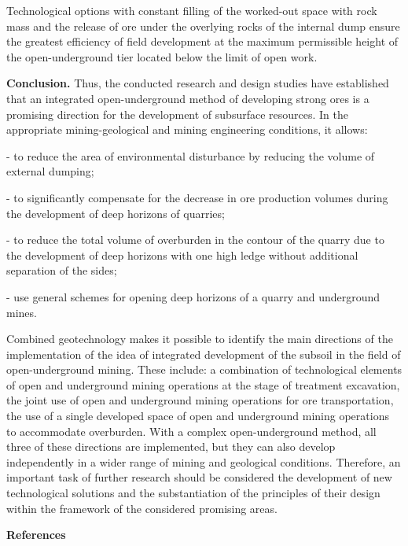 \begin{multicols}{2}
Technological options with constant filling of the worked-out space with
rock mass and the release of ore under the overlying rocks of the
internal dump ensure the greatest efficiency of field development at the
maximum permissible height of the open-underground tier located below
the limit of open work.

{\bfseries Conclusion.} Thus, the conducted research and design studies
have established that an integrated open-underground method of
developing strong ores is a promising direction for the development of
subsurface resources. In the appropriate mining-geological and mining
engineering conditions, it allows:

- to reduce the area of environmental disturbance by reducing the volume
of external dumping;

- to significantly compensate for the decrease in ore production volumes
during the development of deep horizons of quarries;

- to reduce the total volume of overburden in the contour of the quarry
due to the development of deep horizons with one high ledge without
additional separation of the sides;

- use general schemes for opening deep horizons of a quarry and
underground mines.

Combined geotechnology makes it possible to identify the main directions
of the implementation of the idea of integrated development of the
subsoil in the field of open-underground mining. These include: a
combination of technological elements of open and underground mining
operations at the stage of treatment excavation, the joint use of open
and underground mining operations for ore transportation, the use of a
single developed space of open and underground mining operations to
accommodate overburden. With a complex open-underground method, all
three of these directions are implemented, but they can also develop
independently in a wider range of mining and geological conditions.
Therefore, an important task of further research should be considered
the development of new technological solutions and the substantiation of
the principles of their design within the framework of the considered
promising areas.
\end{multicols}

\begin{center}
{\bfseries References}
\end{center}


